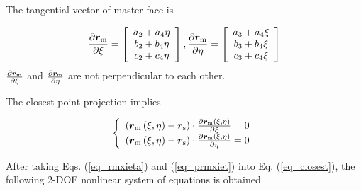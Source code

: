 The tangential vector of master face is

\begin{equation} \label{eq_prmxiet}
\frac{{\partial {{\bm{r}}_{\rm{m}}}}}{{\partial \xi }} = \left[ {\begin{array}{c}
  {{a_2} + {a_4}\eta } \\ 
  {{b_2} + {b_4}\eta } \\ 
  {{c_2} + {c_4}\eta } 
\end{array}} \right],\frac{{\partial {{\bm{r}}_{\rm{m}}}}}{{\partial \eta }} = \left[ {\begin{array}{c}
  {{a_3} + {a_4}\xi } \\ 
  {{b_3} + {b_4}\xi } \\ 
  {{c_3} + {c_4}\xi } 
\end{array}} \right]
\end{equation}
\noindent\small * $\frac{{\partial {{\bm{r}}_{\rm{m}}}}}{{\partial \xi }}$ and $\frac{{\partial {{\bm{r}}_{\rm{m}}}}}{{\partial \eta }}$ are not perpendicular to each other.

The closest point projection implies

\begin{equation} \label{eq_closest}
\left\{ {\begin{array}{c}
  {\left( {{{\bm{r}}_{\rm{m}}}\left( {\xi ,\eta } \right) - {{\bm{r}}_{\rm{s}}}} \right) \cdot \frac{{\partial {{\bm{r}}_{\rm{m}}}\left( {\xi ,\eta } \right)}}{{\partial \xi }} = 0} \\ 
  {\left( {{{\bm{r}}_{\rm{m}}}\left( {\xi ,\eta } \right) - {{\bm{r}}_{\rm{s}}}} \right) \cdot \frac{{\partial {{\bm{r}}_{\rm{m}}}\left( {\xi ,\eta } \right)}}{{\partial \eta }} = 0} 
\end{array}} \right.
\end{equation}

After taking Eqs. (\ref{eq_rmxieta}) and (\ref{eq_prmxiet}) into Eq. (\ref{eq_closest}), the following 2-DOF nonlinear system of equations is obtained

